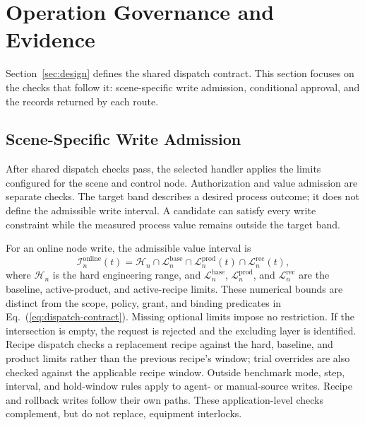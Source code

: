 \section{Operation Governance and Evidence}
\label{sec:modules}
Section~\ref{sec:design} defines the shared dispatch contract. This section
focuses on the checks that follow it: scene-specific write admission,
conditional approval, and the records returned by each route.

\subsection{Scene-Specific Write Admission}
\label{sec:governed}
After shared dispatch checks pass, the selected handler applies the limits
configured for the scene and control node. Authorization and value admission
are separate checks. The target band describes a desired process outcome; it
does not define the admissible write interval. A candidate can satisfy every
write constraint while the measured process value remains outside the target
band.

For an online node write, the admissible value interval is
\begin{equation}
\mathcal{I}^{\mathrm{online}}_n(t)=
\mathcal{H}_n\cap\mathcal{L}^{\mathrm{base}}_n\cap\mathcal{L}^{\mathrm{prod}}_n(t)\cap\mathcal{L}^{\mathrm{rec}}_n(t),
\label{eq:admission}
\end{equation}
where $\mathcal{H}_n$ is the hard engineering range, and
$\mathcal{L}^{\mathrm{base}}_n$, $\mathcal{L}^{\mathrm{prod}}_n$, and
$\mathcal{L}^{\mathrm{rec}}_n$ are the baseline, active-product, and
active-recipe limits. These numerical bounds are distinct from the scope,
policy, grant, and binding predicates in Eq.~(\ref{eq:dispatch-contract}).
Missing optional limits impose no restriction. If the intersection is empty,
the request is rejected and the excluding layer is identified. Recipe dispatch checks a
replacement recipe against the hard, baseline, and product limits rather than
the previous recipe's window; trial overrides are also checked against the
applicable recipe window. Outside benchmark mode, step, interval, and
hold-window rules apply to agent- or manual-source writes. Recipe and rollback
writes follow their own paths. These application-level checks complement, but
do not replace, equipment interlocks.


